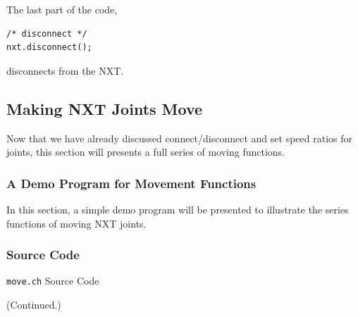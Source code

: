 \documentclass[11pt]{article}
\begin{document}
\noindent
The last part of the code,
\begin{verbatim}
/* disconnect */
nxt.disconnect();
\end{verbatim}
disconnects from the NXT.\\

\subsection{\label{sec:move_demo}Making NXT Joints Move}
Now that we have already discussed connect/disconnect and set speed ratios for joints, this section will presents a full
series of moving functions.

\subsubsection{A Demo Program for Movement Functions}
In this section, a simple demo program will be presented to illustrate the series functions of moving NXT joints.

\subsubsection*{Source Code}

\begin{Program}[H]
    {\small}
    \caption{\texttt{move.ch} Source Code\label{prog_move.ch}}
\end{Program}
\addtocounter{Program}{-1}
\begin{Program}[H]
    {\small}
    \caption{(Continued.)\label{prog_move.ch}}
\end{Program}
\end{document}
